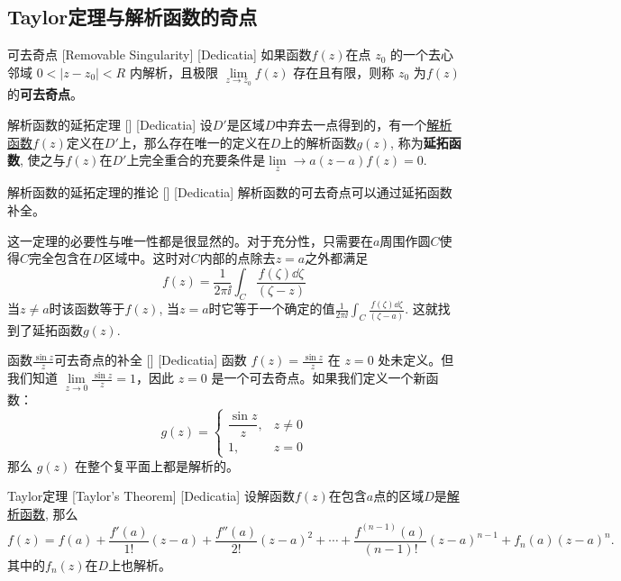 \documentclass[UTF8]{ctexart}
\newcommand{\AnalyticalFunction}{\hyperref[dfn:AnalyticalFunction]{解析函数}}
\begin{document}
\subsection{Taylor定理与解析函数的奇点}
\begin{dfn}
    [RemovableSingularity]
    {可去奇点}
    [Removable Singularity]
    [Dedicatia]
    如果函数\( f(z) \)在点 \( z_0 \) 的一个去心邻域 \( 0 < |z - z_0| < R \) 内解析，且极限 \( \lim\limits_{z \to z_0} f(z) \) 存在且有限，则称 \( z_0 \) 为\( f(z) \)的\textbf{可去奇点}。
\end{dfn}
\begin{thm}
    [UUID]
    {解析函数的延拓定理}
    []
    [Dedicatia]
    设$D'$是区域$D$中弃去一点得到的，有一个\AnalyticalFunction $f(z)$定义在$D'$上，那么存在唯一的定义在$D$上的解析函数$g(z)$, 称为\textbf{延拓函数}, 使之与$f(z)$在$D'$上完全重合的充要条件是$\lim\limits_z\to a(z-a)f(z)=0$.
\end{thm}
\begin{crl}
    [UUID]
    {解析函数的延拓定理的推论}
    []
    [Dedicatia]
    解析函数的可去奇点可以通过延拓函数补全。
\end{crl}
\begin{prf}
    这一定理的必要性与唯一性都是很显然的。对于充分性，只需要在$a$周围作圆$C$使得$C$完全包含在$D$区域中。这时对$C$内部的点除去$z=a$之外都满足
    \[f(z)=\frac{1}{2\pi\ii}\int_C \frac{f(\zeta)\dd{\zeta}}{(\zeta-z)}\]
    当$z\neq a$时该函数等于$f(z)$, 当$z=a$时它等于一个确定的值$\frac{1}{2\pi\ii}\int_C \frac{f(\zeta)\dd{\zeta}}{(\zeta-a)}$. 这就找到了延拓函数$g(z)$.
\end{prf}
\begin{xmp}
    [UUID]
    {函数$\frac{\sin z}{z}$可去奇点的补全}
    []
    [Dedicatia]
    函数 \( f(z) = \frac{\sin z}{z} \) 在 \( z = 0 \) 处未定义。但我们知道 \( \lim\limits_{z \to 0} \frac{\sin z}{z} = 1 \)，因此 \( z=0 \) 是一个可去奇点。如果我们定义一个新函数：
    \[
    g(z) = \begin{cases}
    \dfrac{\sin z}{z}, & z \neq 0 \\
    1, & z = 0
    \end{cases}
    \]
    那么 \( g(z) \) 在整个复平面上都是解析的。
\end{xmp}
\begin{thm}
    [Taylor]
    {Taylor定理\label{thm:Taylor}}
    [Taylor's Theorem]
    [Dedicatia]
    设解函数$f(z)$在包含$a$点的区域$D$是\AnalyticalFunction , 那么
    \[f(z)=f(a)+\frac{f'(a)}{1!}(z-a)+\frac{f''(a)}{2!}(z-a)^2+\cdots+\frac{f^{(n-1)}(a)}{(n-1)!}(z-a)^{n-1}+f_n(a)(z-a)^n.\]
    其中的$f_n(z)$在$D$上也解析。
\end{thm}
\end{document}
